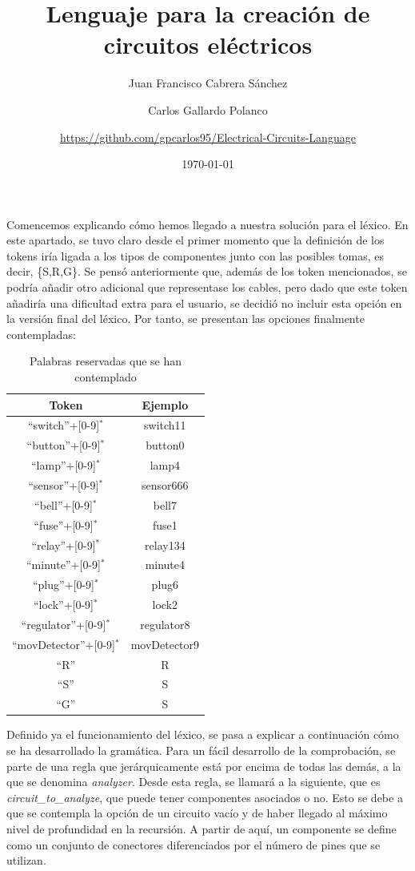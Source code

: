 \documentclass{article}
\author{Juan Francisco Cabrera Sánchez \and Carlos Gallardo Polanco \and \newline \url{https://github.com/gpcarlos95/Electrical-Circuits-Language}}
\title{Lenguaje para la creación de circuitos eléctricos}
\date{\today}
\begin{document}
\maketitle

Comencemos explicando cómo hemos llegado a nuestra solución para el léxico. En este apartado, se tuvo claro desde el primer momento que la definición de los tokens iría ligada a los tipos de componentes junto con las posibles tomas, es decir, \{S,R,G\}. Se pensó anteriormente que, además de los token mencionados, se podría añadir otro adicional que representase los cables, pero dado que este token añadiría una dificultad extra para el usuario, se decidió no incluir esta opción en la versión final del léxico. Por tanto, se presentan las opciones finalmente contempladas:

\begin{table}[h!]
  \centering
  \begin{tabular}{|c|c|}
    \hline
    Token & Ejemplo \\ \hline
  ``switch''+[0-9]$^*$ & switch11 \\ \hline
  ``button''+[0-9]$^*$ & button0 \\ \hline
  ``lamp''+[0-9]$^*$ & lamp4 \\ \hline
  ``sensor''+[0-9]$^*$ & sensor666 \\ \hline
  ``bell''+[0-9]$^*$ & bell7 \\ \hline
  ``fuse''+[0-9]$^*$ & fuse1 \\ \hline
  ``relay''+[0-9]$^*$ & relay134 \\ \hline
  ``minute''+[0-9]$^*$ & minute4 \\ \hline
  ``plug''+[0-9]$^*$ & plug6 \\ \hline
  ``lock''+[0-9]$^*$ & lock2 \\ \hline
  ``regulator''+[0-9]$^*$ & regulator8 \\ \hline
  ``movDetector''+[0-9]$^*$ & movDetector9 \\ \hline
  ``R'' & R \\ \hline
  ``S'' & S \\ \hline
  ``G'' & S \\ \hline
  \end{tabular}
  \caption{Palabras reservadas que se han contemplado}
  \label{}
\end{table}

Definido ya el funcionamiento del léxico, se pasa a explicar a continuación cómo se ha desarrollado la gramática. Para un fácil desarrollo de la comprobación, se parte de una regla que jerárquicamente está por encima de todas las demás, a la que se denomina \emph{analyzer}. Desde esta regla, se llamará a la siguiente, que es \emph{circuit\_to\_analyze}, que puede tener componentes asociados o no. Esto se debe a que se contempla la opción de un circuito vacío y de haber llegado al máximo nivel de profundidad en la recursión. A partir de aquí, un componente se define como un conjunto de conectores diferenciados por el número de pines que se utilizan.
\end{document}
